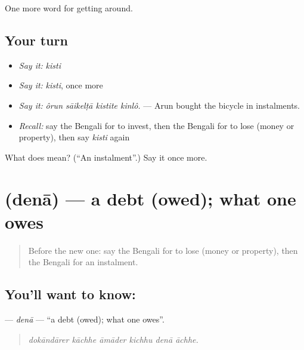 \begin{grammarlens}[title={What you've built}]
One more word for getting around.
\end{grammarlens}

\subsection*{Your turn}
\begin{itemize}
\raggedright
  \item \emph{Say it:} \emph{kisti}
  \item \emph{Say it:} \emph{kisti}, once more
  \item \emph{Say it:} \emph{ôrun sāikelṭā kistite kinlô.} — Arun bought the bicycle in instalments.
  \item \emph{Recall:} say the Bengali for to invest, then the Bengali for to lose (money or property), then say \emph{kisti} again
\end{itemize}

\begin{tcolorbox}[breakable,colback=teal!4,colframe=teal!35!black,title={Before you move on}]
What does  mean? (\textquotedblleft{}An instalment\textquotedblright{}.) Say it once more.
\end{tcolorbox}
\section[\texorpdfstring{\bn{দেনা} (denā)}{দেনা (denā)}]{ (denā) — a debt (owed); what one owes}

\label{lesson:BN-C416-dena}



\begin{quote}
Before the new one: say the Bengali for to lose (money or property), then the Bengali for an instalment.
\end{quote}

\subsection*{You'll want to know: }
\textbf{} — \emph{denā} — \textquotedblleft{}a debt (owed); what one owes\textquotedblright{}.

\begin{quote}
     
\end{quote}

\begin{quote}
\emph{dokāndārer kāchhe āmāder kichhu denā āchhe.}
\end{quote}

